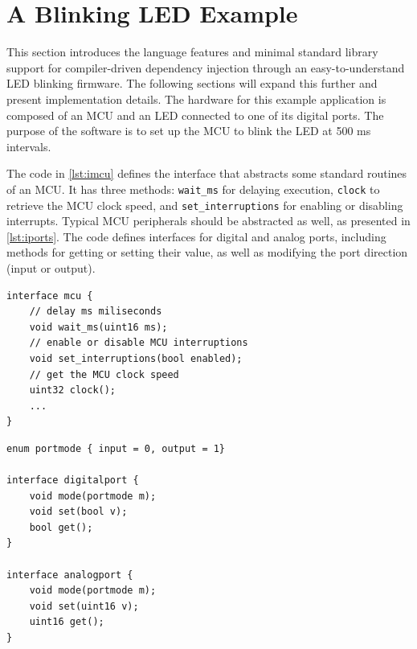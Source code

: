 \documentclass[10pt,sigplan,screen,anonymous]{acmart}
\begin{document}
\section{A Blinking LED Example} \label{sec:ledblink}
 
This section introduces the language features and minimal standard library support for compiler-driven dependency injection through an easy-to-understand LED blinking firmware. The following sections will expand this further and present implementation details. The hardware for this example application is composed of an MCU and an LED connected to one of its digital ports. The purpose of the software is to set up the MCU to blink the LED at 500 ms intervals.

The code in \autoref{lst:imcu} defines the interface that abstracts some standard routines of an MCU. It has three methods: {\tt wait\_ms} for delaying execution, {\tt clock} to retrieve the MCU clock speed, and {\tt set\_interruptions} for enabling or disabling interrupts. Typical MCU peripherals should be abstracted as well, as presented in \autoref{lst:iports}. The code defines interfaces for digital and analog ports, including methods for getting or setting their value, as well as modifying the port direction (input or output).



\begin{lstlisting}[float=tp, language=rob, caption=An example MCU interface, label=lst:imcu]
interface mcu {
	// delay ms miliseconds
	void wait_ms(uint16 ms);
	// enable or disable MCU interruptions
	void set_interruptions(bool enabled);
	// get the MCU clock speed
	uint32 clock();
	...
}
\end{lstlisting}

\begin{lstlisting}[float=tp, caption=Interfaces for digital and analog ports, label=lst:iports]
enum portmode { input = 0, output = 1}

interface digitalport {
	void mode(portmode m);
	void set(bool v);
	bool get();
}

interface analogport {
	void mode(portmode m);
	void set(uint16 v);
	uint16 get();
}
\end{lstlisting}
\end{document}
